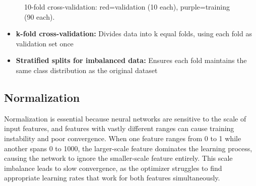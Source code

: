 \begin{figure}[h]
  \caption{10-fold cross-validation: red=validation (10 each), purple=training (90 each).}
  \label{fig:kfold-cv}
\end{figure}

\begin{itemize}
    \item \textbf{k-fold cross-validation:} Divides data into k equal folds, using each fold as validation set once
    \item \textbf{Stratified splits for imbalanced data:} Ensures each fold maintains the same class distribution as the original dataset
\end{itemize}


\subsection{Normalization}

Normalization is essential because neural networks are sensitive to the scale of input features, and features with vastly different ranges can cause training instability and poor convergence. When one feature ranges from 0 to 1 while another spans 0 to 1000, the larger-scale feature dominates the learning process, causing the network to ignore the smaller-scale feature entirely. This scale imbalance leads to slow convergence, as the optimizer struggles to find appropriate learning rates that work for both features simultaneously.

